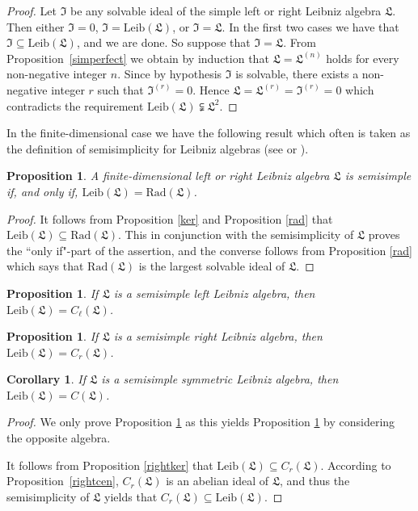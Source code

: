 \documentclass{amsart}
\newtheorem{pro}[thm]{Proposition}
\newtheorem{cor}[thm]{Corollary}
\numberwithin{equation}{section}
\newcommand{\rad}{\mathrm{Rad}}
\newcommand{\leib}{\mathrm{Leib}}
\newcommand{\lf}{\mathfrak{L}}
\newcommand{\If}{\mathfrak{I}}
\begin{document}
\begin{proof}
Let $\If$ be any solvable ideal of the simple left or right Leibniz algebra $\lf$. Then either
$\If=0$, $\If=\leib(\lf)$, or $\If=\lf$. In the first two cases we have that $\If\subseteq
\leib(\lf)$, and we are done. So suppose that $\If=\lf$. From Proposition~\ref{simperfect}
we obtain by induction that $\lf=\lf^{(n)}$ holds for every non-negative integer $n$. Since
by hypothesis $\If$ is solvable, there exists a non-negative integer $r$ such that $\If^{(r)}
=0$. Hence $\lf=\lf^{(r)}=\If^{(r)}=0$ which contradicts the requirement $\leib(\lf)
\subsetneqq\lf^2$.
\end{proof}

In the finite-dimensional case we have the following result which often is taken as the definition
of semisimplicity for Leibniz algebras (see \cite[Definition 5.2]{DMS1} or \cite[Definition 2.12]{FM}).

\begin{pro}\label{semisimrad}
A finite-dimensional left or right Leibniz algebra $\lf$ is semisimple if, and only if, $\leib(\lf)=
\rad(\lf)$.
\end{pro}

\begin{proof}
It follows from Proposition \ref{ker} and Proposition \ref{rad} that $\leib(\lf)\subseteq\rad(\lf)$.
This in conjunction with the semisimplicity of $\lf$ proves the ``only if"-part of the assertion, and
the converse follows from Proposition \ref{rad} which says that $\rad(\lf)$ is the largest solvable
ideal of $\lf$.
\end{proof}

\begin{pro}\label{semisimleftcen}
If $\lf$ is a semisimple left Leibniz algebra, then $\leib(\lf)=C_\ell(\lf)$. 
\end{pro}

\begin{pro}\label{semisimrightcen}
If $\lf$ is a semisimple right Leibniz algebra, then $\leib(\lf)=C_r(\lf)$. 
\end{pro}

\begin{cor}\label{semisimcen}
If $\lf$ is a semisimple symmetric Leibniz algebra, then $\leib(\lf)=C(\lf)$. 
\end{cor}

\begin{proof}
We only prove Proposition \ref{semisimrightcen} as this yields Proposition \ref{semisimleftcen}
by considering the opposite algebra.

It follows from Proposition \ref{rightker} that $\leib(\lf)\subseteq C_r(\lf)$. According to
Proposition~\ref{rightcen}, $C_r(\lf)$ is an abelian ideal of $\lf$, and thus the semisimplicity
of $\lf$ yields that $C_r(\lf)\subseteq\leib(\lf)$.
\end{proof}
\end{document}
